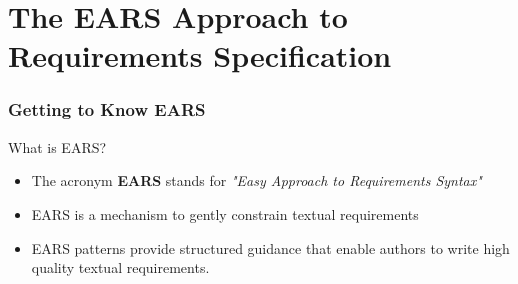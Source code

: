 \documentclass[aspectratio=169]{beamer}
\begin{document}
\frame[plain]{\titlepage}

\section*{The EARS Approach to Requirements Specification}

\begin{frame}[shrink]
  \small
  \frametitle{Getting to Know EARS}
  \begin{block}{What is EARS?}
  \begin{itemize}
    \item The acronym {\bf EARS} stands for {\it "Easy Approach to Requirements Syntax"} 
    \item EARS is a mechanism to gently constrain textual requirements
    \item EARS patterns provide structured guidance that enable authors to write high quality textual requirements.
  \end{itemize}
  \end{block}
\end{frame}
\end{document}
